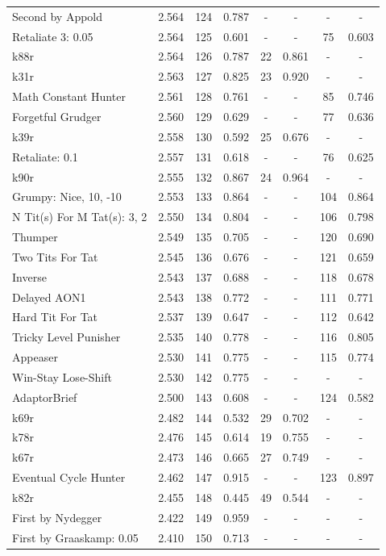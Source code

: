 \begin{tabular}{lccccccc}
Second by Appold & 2.564 & 124 & 0.787 & - & - & - & - \\
Retaliate 3: 0.05 & 2.564 & 125 & 0.601 & - & - & 75 & 0.603 \\
k88r & 2.564 & 126 & 0.787 & 22 & 0.861 & - & - \\
k31r & 2.563 & 127 & 0.825 & 23 & 0.920 & - & - \\
Math Constant Hunter & 2.561 & 128 & 0.761 & - & - & 85 & 0.746 \\
Forgetful Grudger & 2.560 & 129 & 0.629 & - & - & 77 & 0.636 \\
k39r & 2.558 & 130 & 0.592 & 25 & 0.676 & - & - \\
Retaliate: 0.1 & 2.557 & 131 & 0.618 & - & - & 76 & 0.625 \\
k90r & 2.555 & 132 & 0.867 & 24 & 0.964 & - & - \\
Grumpy: Nice, 10, -10 & 2.553 & 133 & 0.864 & - & - & 104 & 0.864 \\
N Tit(s) For M Tat(s): 3, 2 & 2.550 & 134 & 0.804 & - & - & 106 & 0.798 \\
Thumper & 2.549 & 135 & 0.705 & - & - & 120 & 0.690 \\
Two Tits For Tat & 2.545 & 136 & 0.676 & - & - & 121 & 0.659 \\
Inverse & 2.543 & 137 & 0.688 & - & - & 118 & 0.678 \\
Delayed AON1 & 2.543 & 138 & 0.772 & - & - & 111 & 0.771 \\
Hard Tit For Tat & 2.537 & 139 & 0.647 & - & - & 112 & 0.642 \\
Tricky Level Punisher & 2.535 & 140 & 0.778 & - & - & 116 & 0.805 \\
Appeaser & 2.530 & 141 & 0.775 & - & - & 115 & 0.774 \\
Win-Stay Lose-Shift & 2.530 & 142 & 0.775 & - & - & - & - \\
AdaptorBrief & 2.500 & 143 & 0.608 & - & - & 124 & 0.582 \\
k69r & 2.482 & 144 & 0.532 & 29 & 0.702 & - & - \\
k78r & 2.476 & 145 & 0.614 & 19 & 0.755 & - & - \\
k67r & 2.473 & 146 & 0.665 & 27 & 0.749 & - & - \\
Eventual Cycle Hunter & 2.462 & 147 & 0.915 & - & - & 123 & 0.897 \\
k82r & 2.455 & 148 & 0.445 & 49 & 0.544 & - & - \\
First by Nydegger & 2.422 & 149 & 0.959 & - & - & - & - \\
First by Graaskamp: 0.05 & 2.410 & 150 & 0.713 & - & - & - & - \\

\end{tabular}
